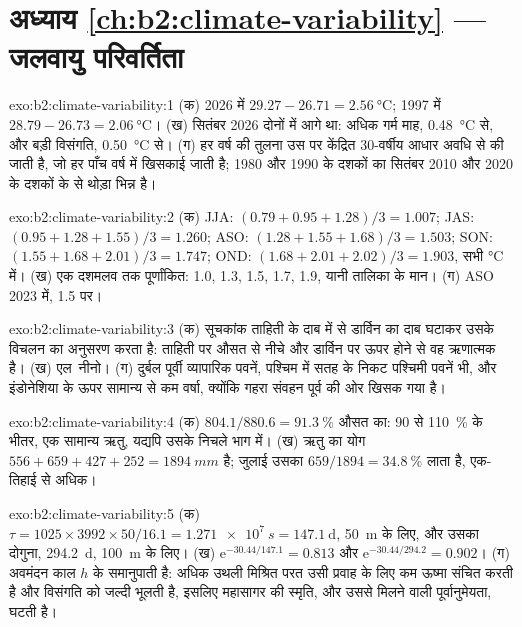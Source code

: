 \section*{अध्याय \ref{ch:b2:climate-variability} --- जलवायु परिवर्तिता}

\begin{solution}{exo:b2:climate-variability:1}
(क) 2026 में $29.27 - 26.71 = \qty{2.56}{\celsius}$; 1997 में $28.79 - 26.73 = \qty{2.06}{\celsius}$।
(ख) सितंबर 2026 दोनों में आगे था: अधिक गर्म माह, \qty{0.48}{\celsius} से, और बड़ी विसंगति,
\qty{0.50}{\celsius} से। (ग) हर वर्ष की तुलना उस पर केंद्रित 30-वर्षीय आधार अवधि से की जाती है, जो
हर पाँच वर्ष में खिसकाई जाती है; 1980 और 1990 के दशकों का सितंबर 
2010 और 2020 के दशकों के  से थोड़ा भिन्न है।
\end{solution}

\begin{solution}{exo:b2:climate-variability:2}
(क) JJA: $(0.79 + 0.95 + 1.28)/3 = 1.007$; JAS: $(0.95 + 1.28 + 1.55)/3 = 1.260$; ASO: $(1.28 +
1.55 + 1.68)/3 = 1.503$; SON: $(1.55 + 1.68 + 2.01)/3 = 1.747$; OND: $(1.68 + 2.01 + 2.02)/3 =
1.903$, सभी \unit{\celsius} में। (ख) एक दशमलव तक पूर्णांकित: 1.0, 1.3, 1.5, 1.7, 1.9, यानी
तालिका के मान। (ग) ASO 2023 में, 1.5 पर।
\end{solution}

\begin{solution}{exo:b2:climate-variability:3}
(क) सूचकांक ताहिती के दाब में से डार्विन का दाब घटाकर उसके विचलन का अनुसरण करता है: ताहिती पर औसत से
नीचे और डार्विन पर ऊपर होने से वह ऋणात्मक है। (ख) एल~नीनो। (ग) दुर्बल पूर्वी व्यापारिक पवनें, पश्चिम में
सतह के निकट पश्चिमी पवनें भी, और इंडोनेशिया के ऊपर सामान्य से कम वर्षा, क्योंकि
गहरा संवहन पूर्व की ओर खिसक गया है।
\end{solution}

\begin{solution}{exo:b2:climate-variability:4}
(क) $804.1/880.6 = \qty{91.3}{\percent}$ औसत का: 90 से \qty{110}{\percent} के भीतर, एक
सामान्य ऋतु, यद्यपि उसके निचले भाग में। (ख) ऋतु का योग $556 + 659 + 427 + 252 =
\qty{1894}{mm}$ है; जुलाई उसका $659/1894 = \qty{34.8}{\percent}$ लाता है, एक-तिहाई से अधिक।
\end{solution}

\begin{solution}{exo:b2:climate-variability:5}
(क) $\tau = 1025 \times 3992 \times 50/16.1 = \qty{1.271e7}{s} = \qty{147.1}{\day}$, \qty{50}{m} के लिए,
और उसका दोगुना, \qty{294.2}{\day}, \qty{100}{m} के लिए। (ख) $\mathrm{e}^{-30.44/147.1} =
0.813$ और $\mathrm{e}^{-30.44/294.2} = 0.902$। (ग) अवमंदन काल $h$ के समानुपाती है: अधिक
उथली मिश्रित परत उसी प्रवाह के लिए कम ऊष्मा संचित करती है और विसंगति को जल्दी भूलती है, इसलिए
महासागर की स्मृति, और उससे मिलने वाली पूर्वानुमेयता, घटती है।
\end{solution}

